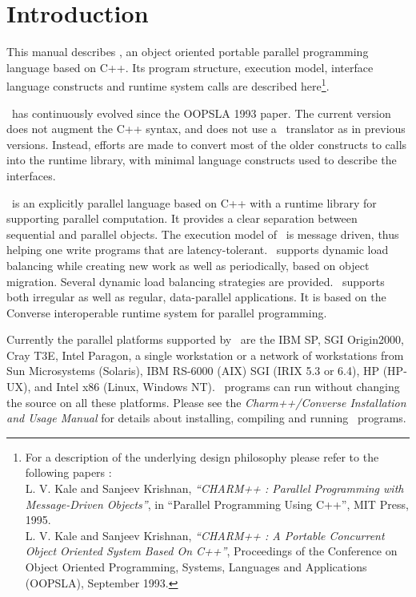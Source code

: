 \section{Introduction}


This manual describes \charmpp, an object oriented portable parallel
programming language based on C++. Its program structure, execution
model, interface language constructs and runtime system calls are
described here\footnote{For a description of the underlying design
philosophy please refer to the following papers :\\
    L. V. Kale and Sanjeev Krishnan,
    {\em ``CHARM++ : Parallel Programming with Message-Driven Objects''},
    in ``Parallel Programming Using C++'',
    MIT Press, 1995. \\
    L. V. Kale and Sanjeev Krishnan,
    {\em ``CHARM++ : A Portable Concurrent Object Oriented System
    Based On C++''},
    Proceedings of the Conference on Object Oriented Programming,
    Systems, Languages and Applications (OOPSLA), September 1993.
}.

\charmpp\ has continuously evolved since the OOPSLA 1993 paper.
The current version does not augment the C++ syntax, and does not
use a \charmpp\ translator as in previous versions. Instead, efforts
are made to convert most of the older constructs to calls into the
runtime library, with minimal language constructs used to describe
the interfaces.

\charmpp\ is an explicitly parallel language based on C++ with a
runtime library for supporting parallel computation. 
It provides a clear separation between sequential
and parallel objects.  The execution model of \charmpp\ is message
driven, thus helping one write programs that are latency-tolerant.
\charmpp\ supports dynamic load balancing while creating new work as well
as periodically, based on object migration. 
Several dynamic load balancing strategies are
provided.  \charmpp\ supports both irregular as well as regular,
data-parallel applications.
It is based on the {\sc Converse} interoperable runtime system for
parallel programming.

Currently the parallel platforms supported by \charmpp\ are the 
IBM SP, SGI Origin2000, Cray T3E, Intel Paragon,
a single workstation or a network of workstations
from Sun Microsystems (Solaris), IBM RS-6000 (AIX)
SGI (IRIX 5.3 or 6.4), HP (HP-UX), and Intel x86 (Linux, Windows NT).
\charmpp\ programs can run without changing the source on all these platforms.
Please see the {\sl Charm++/Converse Installation and Usage Manual}
for details about installing, compiling and running \charmpp\
programs.

